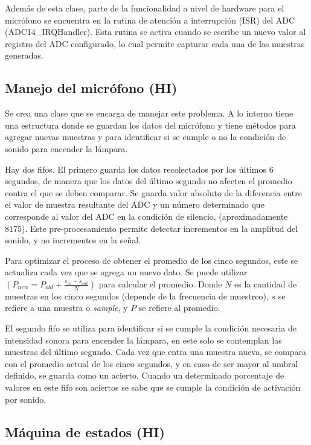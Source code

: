 Además de esta clase, parte de la funcionalidad a nivel de hardware para el micrófono se encuentra
en la rutina de atención a interrupción (ISR) del ADC (ADC14\_IRQHandler). Esta rutina se activa
cuando se escribe un nuevo valor al registro del ADC configurado, lo cual permite capturar cada una
de las muestras generadas.

\subsection{Manejo del micrófono (HI)}

Se crea una clase que se encarga de manejar este problema. A lo interno tiene una estructura donde
se guardan los datos del micrófono y tiene métodos para agregar nuevas muestras y para identificar
si se cumple o no la condición de sonido para encender la lámpara.

Hay dos fifos. El primero guarda los datos recolectados por los últimos 6 segundos, de manera que
los datos del último segundo no afecten el promedio contra el que se deben comparar. Se guarda valor
absoluto de la diferencia entre el valor de muestra resultante del ADC y un número determinado que
corresponde al valor del ADC en la condición de silencio, (aproximadamente 8175). Este
pre-procesamiento permite detectar incrementos en la amplitud del sonido, y no incrementos en la
señal.

Para optimizar el proceso de obtener el promedio de los cinco segundos, este se actualiza cada vez
que se agrega un nuevo dato. Se puede utilizar
$\left(P_{new} = P_{old}+\frac{s_{in}-s_{out}}{N}\right)$ para calcular el promedio. Donde $N$ es la
cantidad de muestras en los cinco segundos (depende de la frecuencia de muestreo), $s$ se refiere a
una muestra o \textit{sample}, y $P$ se refiere al promedio.

El segundo fifo se utiliza para identificar si se cumple la condición necesaria de intensidad sonora
para encender la lámpara, en este solo se contemplan las muestras del último segundo.  Cada vez que
entra una muestra nueva, se compara con el promedio actual de los cinco segundos, y en caso de ser
mayor al umbral definido, se guarda como un acierto. Cuando un determinado porcentaje de valores en
este fifo son aciertos se sabe que se cumple la condición de activación por sonido. 

\subsection{Máquina de estados (HI)}

